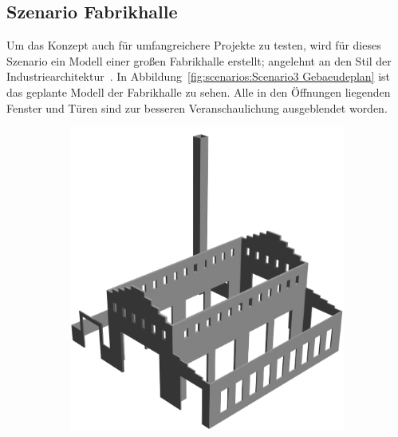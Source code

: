 \subsection{Szenario Fabrikhalle}\label{scenarios:scenario3}
Um das Konzept auch für umfangreichere Projekte zu testen, wird für dieses Szenario ein Modell einer großen Fabrikhalle erstellt; angelehnt an den Stil der Industriearchitektur~\cite{Industriearchitektur}.
In Abbildung~\ref{fig:scenarios:Scenario3 Gebaeudeplan} ist das geplante Modell der Fabrikhalle zu sehen.
Alle in den Öffnungen liegenden Fenster und Türen sind zur besseren Veranschaulichung ausgeblendet worden.
\begin{figure}[hb!]
  \begin{subfigure}[b]{0.49\columnwidth}
    \includegraphics[width=\columnwidth]{fig/scenario3_render_ifc.png}
  \end{subfigure}
  \hfill
  \begin{subfigure}[b]{0.49\columnwidth}

\end{subfigure}
\end{figure}
